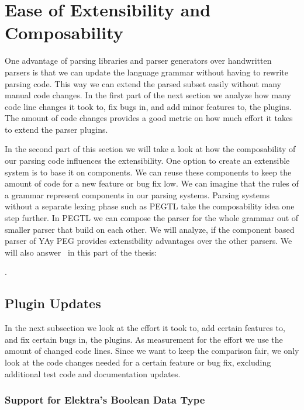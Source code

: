 \section{Ease of Extensibility and Composability}
\label{sec:extensibility}

One advantage of parsing libraries and parser generators over handwritten parsers is that we can update the language grammar without having to rewrite parsing code. This way we can extend the parsed  subset easily without many manual code changes. In the first part of the next section we analyze how many code line changes it took to, fix bugs in, and add minor features to, the  plugins. The amount of code changes provides a good metric on how much effort it takes to extend the parser plugins.

In the second part of this section we will take a look at how the composability of our parsing code influences the extensibility. One option to create an extensible system is to base it on components. We can reuse these components to keep the amount of code for a new feature or bug fix low. We can imagine that the rules of a grammar represent components in our parsing systems. Parsing systems without a separate lexing phase such as PEGTL take the composability idea one step further. In PEGTL we can compose the parser for the whole grammar out of smaller parser that build on each other. We will analyze, if the component based parser of YAy PEG provides extensibility advantages over the other parsers. We will also answer~ in this part of the thesis:

  \closeness*

.

\subsection{Plugin Updates}

In the next subsection we look at the effort it took to, add certain features to, and fix certain bugs in, the  plugins. As measurement for the effort we use the amount of changed code lines. Since we want to keep the comparison fair, we only look at the code changes needed for a certain feature or bug fix, excluding additional test code and documentation updates.

\subsubsection{Support for Elektra’s Boolean Data Type}

